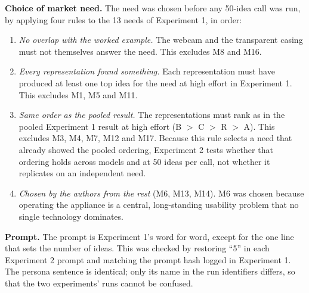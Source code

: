 \textbf{Choice of market need.} The need was chosen before any 50-idea call was run, by applying four rules to the 13 needs of Experiment 1, in order:
\begin{enumerate}
\tightlist
\item
  \emph{No overlap with the worked example.} The webcam and the transparent casing must not themselves answer the need. This excludes M8 and M16.
\item
  \emph{Every representation found something.} Each representation must have produced at least one top idea for the need at high effort in Experiment 1. This excludes M1, M5 and M11.
\item
  \emph{Same order as the pooled result.} The representations must rank as in the pooled Experiment 1 result at high effort (B $>$ C $>$ R $>$ A). This excludes M3, M4, M7, M12 and M17. Because this rule selects a need that already showed the pooled ordering, Experiment 2 tests whether that ordering holds across models and at 50 ideas per call, not whether it replicates on an independent need.
\item
  \emph{Chosen by the authors from the rest} (M6, M13, M14). M6 was chosen because operating the appliance is a central, long-standing usability problem that no single technology dominates.
\end{enumerate}

\textbf{Prompt.} The prompt is Experiment 1's word for word, except for the one line that sets the number of ideas. This was checked by restoring ``5'' in each Experiment 2 prompt and matching the prompt hash logged in Experiment 1. The persona sentence is identical; only its name in the run identifiers differs, so that the two experiments' runs cannot be confused.


